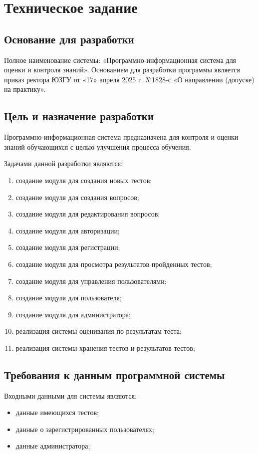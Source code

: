 \section{Техническое задание}
\subsection{Основание для разработки}

Полное наименование системы: «Программно-информационная система для оценки и контроля знаний».
Основанием для разработки программы является приказ ректора ЮЗГУ
от «17» апреля 2025 г. №1828-с «О направлении (допуске) на практику».

\subsection{Цель и назначение разработки}

Программно-информационная система предназначена для контроля и оценки знаний обучающихся с целью улучшения процесса обучения.

Задачами данной разработки являются:
\begin{enumerate}
\item создание модуля для создания новых тестов;
\item создание модуля для создания вопросов;
\item создание модуля для редактирования вопросов;
\item создание модуля для авторизации;
\item создание модуля для регистрации;
\item создание модуля для просмотра результатов пройденных тестов;
\item создание модуля для управления пользователями;
\item создание модуля для пользователя;
\item создание модуля для администратора;
\item реализация системы оценивания по результатам теста;
\item реализация системы хранения тестов и результатов тестов;
\end{enumerate}

\subsection{Требования к данным программной системы}

Входными данными для системы являются:
\begin{itemize}
    \item данные имеющихся тестов;
    \item данные о зарегистрированных пользователях;
    \item данные администратора;
\end{itemize}

